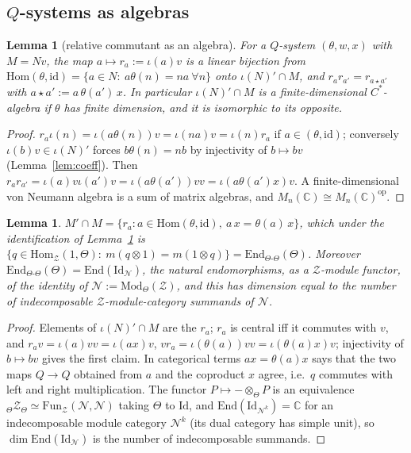 \documentclass[11pt]{article}
\newtheorem{lemma}[theorem]{Lemma}
\theoremstyle{definition}
\theoremstyle{remark}
\begin{document}
\subsection{$Q$-systems as algebras}

\begin{lemma}[relative commutant as an algebra]\label{lem:relcomm}
For a $Q$-system $(\theta,w,x)$ with $M=Nv$, the map $a\mapsto r_a:=\iota(a)v$ is a linear bijection from $\mathrm{Hom}(\theta,\mathrm{id})=\{a\in N:\ a\theta(n)=na\ \forall n\}$ onto $\iota(N)'\cap M$, and $r_ar_{a'}=r_{a\star a'}$ with $a\star a':=a\,\theta(a')\,x$. In particular $\iota(N)'\cap M$ is a finite-dimensional $C^*$-algebra if $\theta$ has finite dimension, and it is isomorphic to its opposite.
\end{lemma}
\begin{proof}
$r_a\iota(n)=\iota(a\theta(n))v=\iota(na)v=\iota(n)r_a$ if $a\in(\theta,\mathrm{id})$; conversely $\iota(b)v\in\iota(N)'$ forces $b\theta(n)=nb$ by injectivity of $b\mapsto bv$ (Lemma~\ref{lem:coeff}). Then $r_ar_{a'}=\iota(a)v\iota(a')v=\iota(a\theta(a'))vv=\iota(a\theta(a')x)v$. A finite-dimensional von Neumann algebra is a sum of matrix algebras, and $M_n(\mathbb C)\cong M_n(\mathbb C)^{\mathrm{op}}$.
\end{proof}
\begin{lemma}\label{lem:centreM}
$M'\cap M=\{r_a: a\in\mathrm{Hom}(\theta,\mathrm{id}),\ a\,x=\theta(a)\,x\}$, which under the identification of Lemma~\ref{lem:relcomm} is $\{q\in\mathrm{Hom}_{\mathcal Z}(1,\Theta):\ m(q\otimes1)=m(1\otimes q)\}=\mathrm{End}_{\Theta\text{-}\Theta}(\Theta)$. Moreover $\mathrm{End}_{\Theta\text{-}\Theta}(\Theta)=\mathrm{End}(\mathrm{Id}_{\mathcal N})$, the natural endomorphisms, as a $\mathcal Z$-module functor, of the identity of $\mathcal N:=\mathrm{Mod}_\Theta(\mathcal Z)$, and this has dimension equal to the number of indecomposable $\mathcal Z$-module-category summands of $\mathcal N$.
\end{lemma}
\begin{proof}
Elements of $\iota(N)'\cap M$ are the $r_a$; $r_a$ is central iff it commutes with $v$, and $r_av=\iota(a)vv=\iota(ax)v$, $vr_a=\iota(\theta(a))vv=\iota(\theta(a)x)v$; injectivity of $b\mapsto bv$ gives the first claim. In categorical terms $ax=\theta(a)x$ says that the two maps $Q\to Q$ obtained from $a$ and the coproduct $x$ agree, i.e.\ $q$ commutes with left and right multiplication. The functor $P\mapsto-\otimes_\Theta P$ is an equivalence $_\Theta\mathcal Z_\Theta\simeq\mathrm{Fun}_{\mathcal Z}(\mathcal N,\mathcal N)$ taking $\Theta$ to $\mathrm{Id}$, and $\mathrm{End}(\mathrm{Id}_{\mathcal N^k})=\mathbb C$ for an indecomposable module category $\mathcal N^k$ (its dual category has simple unit), so $\dim\mathrm{End}(\mathrm{Id}_{\mathcal N})$ is the number of indecomposable summands.
\end{proof}
\end{document}

